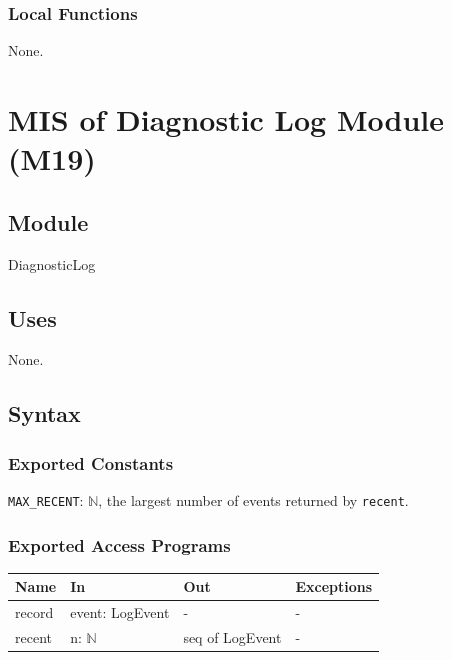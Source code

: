 \documentclass[12pt, titlepage]{article}
\begin{document}
\subsubsection{Local Functions}

None.

\newpage
\section{MIS of Diagnostic Log Module (M19)} \label{MISLog}

\subsection{Module}

DiagnosticLog

\subsection{Uses}

None.

\subsection{Syntax}

\subsubsection{Exported Constants}

\texttt{MAX\_RECENT}: $\mathbb{N}$, the largest number of events returned by
\texttt{recent}.

\subsubsection{Exported Access Programs}

\begin{center}
\small
\begin{tabular}{>{\raggedright\arraybackslash}p{3.7cm} >{\raggedright\arraybackslash}p{3.8cm} >{\raggedright\arraybackslash}p{3.6cm} >{\raggedright\arraybackslash}p{3.7cm}}
\hline
\textbf{Name} & \textbf{In} & \textbf{Out} & \textbf{Exceptions} \\
\hline
record & event: LogEvent & - & - \\
recent & n: $\mathbb{N}$ & seq of LogEvent & - \\
\hline
\end{tabular}
\end{center}
\end{document}

